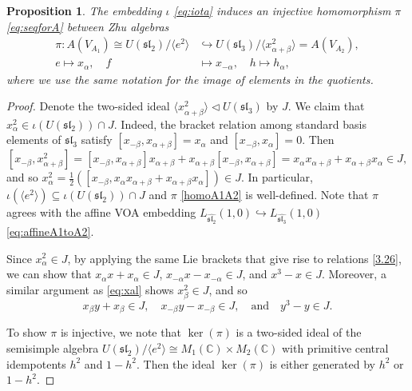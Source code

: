 \documentclass[12pt,a4paper,reqno]{amsart}
\numberwithin{equation}{section}
\numberwithin{equation}{section}
\newtheorem{prop}[thm]{Proposition}
\theoremstyle{definition}
\def \C {\mathbb{C}}
\def \al{\alpha}
\def\hr{\hookrightarrow}
\def \b {\beta}
\def \ssq{\subseteq}
\def\<{\langle}
\def\>{\rangle}
\def\sl{\mathfrak{sl}}
\begin{document}
	\begin{prop}\label{prop:embeddingofA1inA2}
		The embedding $\iota$ \eqref{eq:iota} induces an injective homomorphism $\pi$ \eqref{eq:seqforA}  between Zhu algebras 
		\begin{equation}\label{homoA1A2}
			\begin{aligned}
				\pi: A(V_{A_1})\cong U(\sl_2)/\<e^2\>&\hr U(\sl_3)/\<x_{\al+\b}^2\>=A(V_{A_2}),\\
				e\mapsto x_\al,\quad f&\mapsto x_{-\al},\quad h\mapsto h_\al,
			\end{aligned}
		\end{equation}
		where we use the same notation for the image of elements in the quotients. 
	\end{prop}
	\begin{proof}
		Denote the two-sided ideal $\<x_{\al+\b}^2\>\lhd U(\sl_3)$ by $J$. We claim that $x_\al^2\in \iota(U(\sl_2))\cap J$. Indeed, the bracket relation among standard basis elements of $\sl_3$ satisfy $[x_{-\b},x_{\al+\b}]=x_\al$ and $[x_{-\b},x_{\al}]=0$. Then 
		\begin{equation}\label{eq:xal}
			[x_{-\b},x_{\al+\b}^2]=[x_{-\b},x_{\al+\b}]x_{\al+\b}+x_{\al+\b}[x_{-\b},x_{\al+\b}]=x_\al x_{\al+\b}+x_{\al+\b}x_\al\in J,
		\end{equation}
		and so $x_\al^2=\frac{1}{2}([x_{-\b}, x_\al x_{\al+\b}+x_{\al+\b}x_\al])\in  J$. In particular, $\iota(\<e^2\>)\ssq \iota(U(\sl_2))\cap J$ and $\pi$ \eqref{homoA1A2} is  well-defined. Note that $\pi$ agrees with the affine VOA embedding $L_{\widehat{\sl_2}}(1,0)\hr L_{\widehat{\sl_3}}(1,0)$ \eqref{eq:affineA1toA2}. 
		
		Since $x^2_\al\in J$, by applying the same Lie brackets that give rise to relations \eqref{3.26}, we can show that $x_\al x+ x_\al\in J$, $x_{-\al} x-x_{-\al}\in J$, and $x^3-x\in J$. Moreover, a similar argument as \eqref{eq:xal} shows $x_\b^2\in J$, and so 
		$$x_\b y+ x_\b\in J,\quad x_{-\b} y-x_{-\b}\in J,\quad \mathrm{and} \quad y^3-y\in J.$$
		
		To show $\pi$ is injective, we note that $\ker(\pi)$ is a two-sided ideal of the semisimple algebra $U(\sl_2)/\<e^2\>\cong M_{1}(\C)\times M_{2}(\C)$ with primitive central idempotents $h^2$ and $1-h^2$. Then the ideal $\ker(\pi)$ is either generated by $h^2$ or $1-h^2$. 
		

\end{proof}
\end{document}
